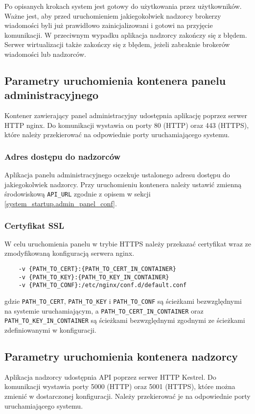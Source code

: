 \documentclass[../opis-rozwiazania.tex]{subfiles}
\begin{document}
Po opisanych krokach system jest gotowy do użytkowania przez użytkowników.
Ważne jest, aby przed uruchomieniem jakiegokolwiek nadzorcy brokerzy wiadomości byli już prawidłowo zainicjalizowani i gotowi na przyjęcie komunikacji.
W przeciwnym wypadku aplikacja nadzorcy zakończy się z błędem.
Serwer wirtualizacji także zakończy się z błędem, jeżeli zabraknie brokerów wiadomości lub nadzorców.

\subsection{Parametry uruchomienia kontenera panelu administracyjnego}
Kontener zawierający panel administracyjny udostępnia aplikację poprzez serwer HTTP nginx.
Do komunikacji wystawia on porty 80 (HTTP) oraz 443 (HTTPS), które należy przekierować na odpowiednie porty uruchamiającego systemu.

\subsubsection{Adres dostępu do nadzorców}
Aplikacja panelu administracyjnego oczekuje ustalonego adresu dostępu do jakiegokolwiek nadzorcy.
Przy uruchomieniu kontenera należy ustawić zmienną środowiskową \texttt{API\_URL} zgodnie z opisem w sekcji \ref{system_startup.admin_panel_conf}.

\subsubsection{Certyfikat SSL}
W celu uruchomienia panelu w trybie HTTPS należy przekazać certyfikat wraz ze zmodyfikowaną konfiguracją serwera nginx.
\begin{verbatim}
	-v {PATH_TO_CERT}:{PATH_TO_CERT_IN_CONTAINER}
	-v {PATH_TO_KEY}:{PATH_TO_KEY_IN_CONTAINER}
	-v {PATH_TO_CONF}:/etc/nginx/conf.d/default.conf
\end{verbatim}
gdzie \texttt{PATH\_TO\_CERT}, \texttt{PATH\_TO\_KEY} i \texttt{PATH\_TO\_CONF} są ścieżkami bezwzględnymi na systemie uruchamiającym, a \texttt{PATH\_TO\_CERT\_IN\_CONTAINER} oraz \texttt{PATH\_TO\_KEY\_IN\_CONTAINER} są ścieżkami bezwzględnymi zgodnymi ze ścieżkami zdefiniowanymi w konfiguracji.

\subsection{Parametry uruchomienia kontenera nadzorcy}
Aplikacja nadzorcy udostępnia API poprzez serwer HTTP Kestrel.
Do komunikacji wystawia porty 5000 (HTTP) oraz 5001 (HTTPS), które można zmienić w dostarczonej konfiguracji.
Należy przekierować je na odpowiednie porty uruchamiającego systemu.
\end{document}
